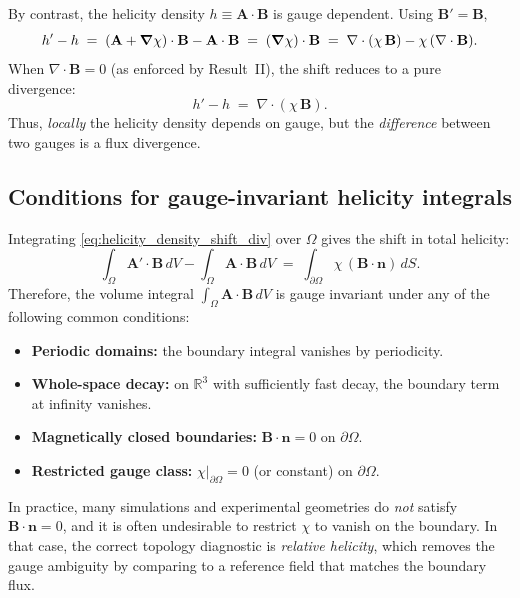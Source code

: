 \documentclass[11pt]{article}
\theoremstyle{plain}
\theoremstyle{definition}
\theoremstyle{remark}
\newcommand{\R}{\mathbb{R}}
\newcommand{\diver}{\nabla\cdot}
\newcommand{\A}{\mathbf{A}}
\newcommand{\B}{\mathbf{B}}
\begin{document}
By contrast, the helicity density $h \equiv \A\cdot\B$ is gauge dependent. Using $\B'=\B$,
\begin{equation}\label{eq:helicity_density_shift}
  h' - h
  \;=\;
  (\A+\grad\chi)\cdot\B - \A\cdot\B
  \;=\;
  (\grad\chi)\cdot\B
  \;=\;
  \diver(\chi\,\B) - \chi\,(\diver\B).
\end{equation}
When $\diver\B=0$ (as enforced by Result~II), the shift reduces to a pure divergence:
\begin{equation}\label{eq:helicity_density_shift_div}
  h' - h \;=\; \diver(\chi\,\B).
\end{equation}
Thus, \emph{locally} the helicity density depends on gauge, but the \emph{difference} between two gauges
is a flux divergence.

\subsection{Conditions for gauge-invariant helicity integrals}\label{sec:result_gauge_integral}
Integrating \eqref{eq:helicity_density_shift_div} over $\Omega$ gives the shift in total helicity:
\begin{equation}\label{eq:helicity_integral_shift}
  \int_{\Omega}\A'\cdot\B\,dV - \int_{\Omega}\A\cdot\B\,dV
  \;=\;
  \int_{\partial\Omega}\chi\,(\B\cdot\mathbf{n})\,dS.
\end{equation}
Therefore, the volume integral $\int_{\Omega}\A\cdot\B\,dV$ is gauge invariant under any of the
following common conditions:

\begin{itemize}[leftmargin=*]
  \item \textbf{Periodic domains:} the boundary integral vanishes by periodicity.
  \item \textbf{Whole-space decay:} on $\R^3$ with sufficiently fast decay, the boundary term at infinity
  vanishes.
  \item \textbf{Magnetically closed boundaries:} $\B\cdot\mathbf{n}=0$ on $\partial\Omega$.
  \item \textbf{Restricted gauge class:} $\chi|_{\partial\Omega}=0$ (or constant) on $\partial\Omega$.
\end{itemize}

In practice, many simulations and experimental geometries do \emph{not} satisfy $\B\cdot\mathbf{n}=0$,
and it is often undesirable to restrict $\chi$ to vanish on the boundary. In that case, the correct
topology diagnostic is \emph{relative helicity}, which removes the gauge ambiguity by comparing to a
reference field that matches the boundary flux.
\end{document}
